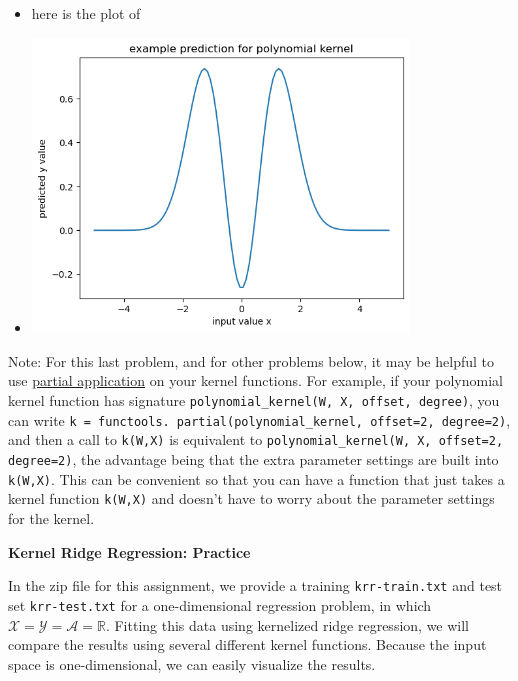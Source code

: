 \documentclass{article}
\newcommand{\nyuparagrah}[1]{\textcolor{nyupurple}{\large #1}}
\theoremstyle{plain}
\theoremstyle{definition}
\begin{document}
\begin{enumerate}
\begin{itemize}
    \item here is the plot of
    \item \includegraphics[width=10cm]{homework/homework_3/immages/question_24_1.png}
\end{itemize}

\setcounter{saveenum}{\value{enumi}}
\end{enumerate}

Note: For this last problem, and for other problems below, it may be helpful
to use \href{https://en.wikipedia.org/wiki/Partial_application}{partial application}
on your kernel functions. For example, if your polynomial kernel function
has signature \texttt{polynomial\_kernel(W, X, offset, degree)}, you
can write \texttt{k = functools. partial(polynomial\_kernel, offset=2,
degree=2)}, and then a call to \texttt{k(W,X)} is equivalent to \texttt{polynomial\_kernel(W,
X, offset=2, degree=2)}, the advantage being that the extra parameter
settings are built into \texttt{k(W,X)}. This can be convenient so
that you can have a function that just takes a kernel function \texttt{k(W,X)}
and doesn't have to worry about the parameter settings for the kernel.

\nyuparagrah{\bf Kernel Ridge Regression: Practice}

In the zip file for this assignment, we provide a training \texttt{krr-train.txt} and test
set \texttt{krr-test.txt} for a one-dimensional
regression problem, in which $\mathcal{X}=\mathcal{Y}=\mathcal{A}=\mathbb{R}$. Fitting this
data using kernelized ridge regression, we will compare the results
using several different kernel functions. Because the input space
is one-dimensional, we can easily visualize the results.
\end{document}
